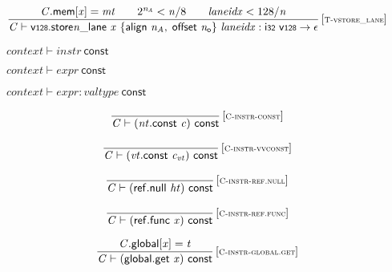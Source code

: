 $$
\begin{array}{@{}c@{}}\displaystyle
\frac{
{\mathit{C}}.\mathsf{mem}[{\mathit{x}}] = {\mathit{mt}}
 \qquad
{2^{{\mathit{n}}_{{\mathit{A}}}}} < {\mathit{n}} / 8
 \qquad
{\mathit{laneidx}} < 128 / {\mathit{n}}
}{
{\mathit{C}} \vdash {{{\mathsf{v{\scriptstyle128}.store}}{{\mathit{n}}}}{\mathsf{\_}}}{\mathsf{lane}}~{\mathit{x}}~\{ \begin{array}[t]{@{}l@{}}
\mathsf{align}~{\mathit{n}}_{{\mathit{A}}},\; \mathsf{offset}~{\mathit{n}}_{{\mathsf{o}}} \}\end{array}~{\mathit{laneidx}} : \mathsf{i{\scriptstyle32}}~\mathsf{v{\scriptstyle128}} \rightarrow \epsilon
} \, {[\textsc{\scriptsize T{-}vstore\_lane}]}
\qquad
\end{array}
$$

\vspace{1ex}

$\boxed{{\mathit{context}} \vdash {\mathit{instr}}~\mathsf{const}}$

$\boxed{{\mathit{context}} \vdash {\mathit{expr}}~\mathsf{const}}$

$\boxed{{\mathit{context}} \vdash {\mathit{expr}} : {\mathit{valtype}}~\mathsf{const}}$

$$
\begin{array}{@{}c@{}}\displaystyle
\frac{
}{
{\mathit{C}} \vdash ({\mathit{nt}}.\mathsf{const}~{\mathit{c}})~\mathsf{const}
} \, {[\textsc{\scriptsize C{-}instr{-}const}]}
\qquad
\end{array}
$$

$$
\begin{array}{@{}c@{}}\displaystyle
\frac{
}{
{\mathit{C}} \vdash ({\mathit{vt}}.\mathsf{const}~{\mathit{c}}_{{\mathit{vt}}})~\mathsf{const}
} \, {[\textsc{\scriptsize C{-}instr{-}vvconst}]}
\qquad
\end{array}
$$

$$
\begin{array}{@{}c@{}}\displaystyle
\frac{
}{
{\mathit{C}} \vdash (\mathsf{ref.null}~{\mathit{ht}})~\mathsf{const}
} \, {[\textsc{\scriptsize C{-}instr{-}ref.null}]}
\qquad
\end{array}
$$

$$
\begin{array}{@{}c@{}}\displaystyle
\frac{
}{
{\mathit{C}} \vdash (\mathsf{ref.func}~{\mathit{x}})~\mathsf{const}
} \, {[\textsc{\scriptsize C{-}instr{-}ref.func}]}
\qquad
\end{array}
$$

$$
\begin{array}{@{}c@{}}\displaystyle
\frac{
{\mathit{C}}.\mathsf{global}[{\mathit{x}}] = {\mathit{t}}
}{
{\mathit{C}} \vdash (\mathsf{global.get}~{\mathit{x}})~\mathsf{const}
} \, {[\textsc{\scriptsize C{-}instr{-}global.get}]}
\qquad
\end{array}
$$

